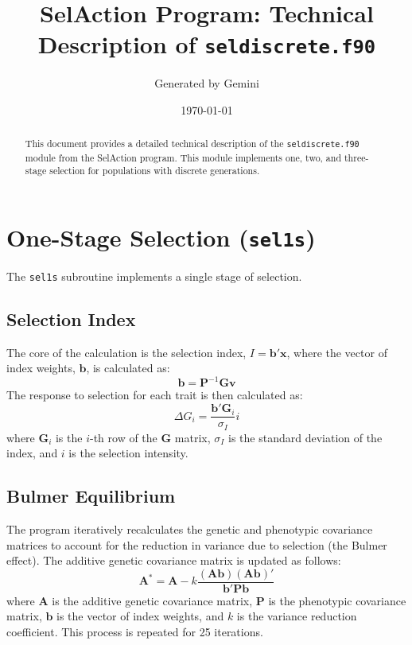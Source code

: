 \documentclass{article}
\title{SelAction Program: Technical Description of \texttt{seldiscrete.f90}}
\author{Generated by Gemini}
\date{\today}
\begin{document}
\maketitle

\begin{abstract}
This document provides a detailed technical description of the \texttt{seldiscrete.f90} module from the SelAction program. This module implements one, two, and three-stage selection for populations with discrete generations.
\end{abstract}

\tableofcontents

\section{One-Stage Selection (\texttt{sel1s})}

The \texttt{sel1s} subroutine implements a single stage of selection.

\subsection{Selection Index}
The core of the calculation is the selection index, $I = \mathbf{b'x}$, where the vector of index weights, $\mathbf{b}$, is calculated as:
\begin{equation}
\mathbf{b} = \mathbf{P}^{-1}\mathbf{Gv}
\end{equation}
The response to selection for each trait is then calculated as:
\begin{equation}
\Delta G_i = \frac{\mathbf{b'G}_i}{\sigma_I} i
\end{equation}
where $\mathbf{G}_i$ is the $i$-th row of the $\mathbf{G}$ matrix, $\sigma_I$ is the standard deviation of the index, and $i$ is the selection intensity.

\subsection{Bulmer Equilibrium}
The program iteratively recalculates the genetic and phenotypic covariance matrices to account for the reduction in variance due to selection (the Bulmer effect). The additive genetic covariance matrix is updated as follows:
\begin{equation}
\mathbf{A}^* = \mathbf{A} - k \frac{(\mathbf{Ab})(\mathbf{Ab})'}{\mathbf{b'Pb}}
\end{equation}
where $\mathbf{A}$ is the additive genetic covariance matrix, $\mathbf{P}$ is the phenotypic covariance matrix, $\mathbf{b}$ is the vector of index weights, and $k$ is the variance reduction coefficient. This process is repeated for 25 iterations.
\end{document}
